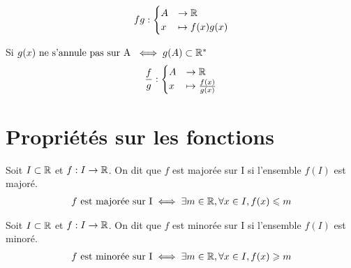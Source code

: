 \begin{graybox}
	\begin{proposition}
		\begin{align*}
			fg : 
			\begin{cases}
				A &\to \mathbb{R} \\
				x &\mapsto f(x)g(x)
			\end{cases}
		\end{align*}
	\end{proposition}
\end{graybox}

\begin{graybox}
	\begin{proposition}
		Si $g(x) \text{ ne s'annule pas sur A } \iff g(A) \subset \mathbb{R}^*$
		\begin{align*}
			\frac{f}{g} : 
			\begin{cases}
				A &\to \mathbb{R} \\
				x &\mapsto \frac{f(x)}{g(x)}
			\end{cases}
		\end{align*}
	\end{proposition}
\end{graybox}

\section{Propriétés sur les fonctions}

\begin{graybox}
	\begin{definition}
		Soit $I \subset \mathbb{R}$ et $f:I\to \mathbb{R}$. 
		On dit que $f$ est majorée sur I si l'ensemble $f(I)$ est majoré.
		\begin{align*}
			f \text{ est majorée sur I} \iff \exists m \in \mathbb{R}, \forall x \in I, f(x) \leqslant m
		\end{align*}
	\end{definition}
\end{graybox}

\begin{graybox}
	\begin{definition}
		Soit $I \subset \mathbb{R}$ et $f:I\to \mathbb{R}$. 
		On dit que $f$ est minorée sur I si l'ensemble $f(I)$ est minoré.
		\begin{align*}
			f \text{ est minorée sur I} \iff \exists m \in \mathbb{R}, \forall x \in I, f(x) \geqslant m 
		\end{align*}
	\end{definition}
\end{graybox}

